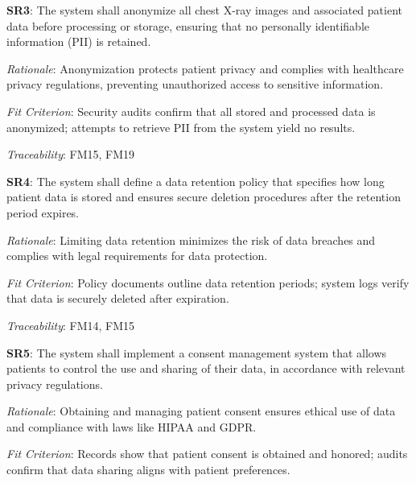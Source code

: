 \documentclass{article}
\begin{document}
\textbf{SR3}: The system shall anonymize all chest X-ray images and associated patient data before processing or storage, ensuring that no personally identifiable information (PII) is retained.

\emph{Rationale}: Anonymization protects patient privacy and complies with healthcare privacy regulations, preventing unauthorized access to sensitive information.

\vspace{0.2cm}

\emph{Fit Criterion}: Security audits confirm that all stored and processed data is anonymized; attempts to retrieve PII from the system yield no results.

\vspace{0.2cm}

\emph{Traceability}: FM15, FM19

\vspace{0.5cm}

\textbf{SR4}: The system shall define a data retention policy that specifies how long patient data is stored and ensures secure deletion procedures after the retention period expires.

\emph{Rationale}: Limiting data retention minimizes the risk of data breaches and complies with legal requirements for data protection.

\vspace{0.2cm}

\emph{Fit Criterion}: Policy documents outline data retention periods; system logs verify that data is securely deleted after expiration.

\vspace{0.2cm}

\emph{Traceability}: FM14, FM15

\vspace{0.5cm}

\textbf{SR5}: The system shall implement a consent management system that allows patients to control the use and sharing of their data, in accordance with relevant privacy regulations.

\emph{Rationale}: Obtaining and managing patient consent ensures ethical use of data and compliance with laws like HIPAA and GDPR.

\vspace{0.2cm}

\emph{Fit Criterion}: Records show that patient consent is obtained and honored; audits confirm that data sharing aligns with patient preferences.
\end{document}
